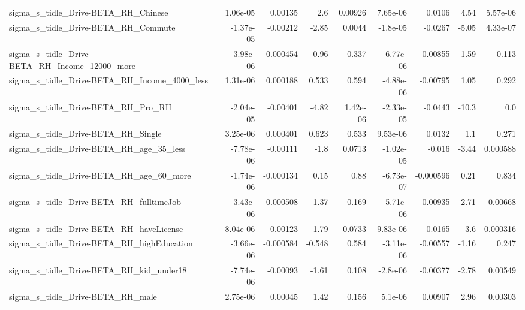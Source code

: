 \begin{tabular}{lrrrrrrrr}
sigma\_s\_tidle\_Drive-BETA\_RH\_Chinese                &    1.06e-05 &      0.00135 &       2.6 &  0.00926 &   7.65e-06 &      0.0106 &         4.54 &      5.57e-06 \\
sigma\_s\_tidle\_Drive-BETA\_RH\_Commute                &   -1.37e-05 &     -0.00212 &     -2.85 &   0.0044 &   -1.8e-05 &     -0.0267 &        -5.05 &      4.33e-07 \\
sigma\_s\_tidle\_Drive-BETA\_RH\_Income\_12000\_more      &   -3.98e-06 &    -0.000454 &     -0.96 &    0.337 &  -6.77e-06 &    -0.00855 &        -1.59 &         0.113 \\
sigma\_s\_tidle\_Drive-BETA\_RH\_Income\_4000\_less       &    1.31e-06 &     0.000188 &     0.533 &    0.594 &  -4.88e-06 &    -0.00795 &         1.05 &         0.292 \\
sigma\_s\_tidle\_Drive-BETA\_RH\_Pro\_RH                 &   -2.04e-05 &     -0.00401 &     -4.82 & 1.42e-06 &  -2.33e-05 &     -0.0443 &        -10.3 &           0.0 \\
sigma\_s\_tidle\_Drive-BETA\_RH\_Single                 &    3.25e-06 &     0.000401 &     0.623 &    0.533 &   9.53e-06 &      0.0132 &          1.1 &         0.271 \\
sigma\_s\_tidle\_Drive-BETA\_RH\_age\_35\_less            &   -7.78e-06 &     -0.00111 &      -1.8 &   0.0713 &  -1.02e-05 &      -0.016 &        -3.44 &      0.000588 \\
sigma\_s\_tidle\_Drive-BETA\_RH\_age\_60\_more            &   -1.74e-06 &    -0.000134 &      0.15 &     0.88 &  -6.73e-07 &   -0.000596 &         0.21 &         0.834 \\
sigma\_s\_tidle\_Drive-BETA\_RH\_fulltimeJob            &   -3.43e-06 &    -0.000508 &     -1.37 &    0.169 &  -5.71e-06 &    -0.00935 &        -2.71 &       0.00668 \\
sigma\_s\_tidle\_Drive-BETA\_RH\_haveLicense            &    8.04e-06 &      0.00123 &      1.79 &   0.0733 &   9.83e-06 &      0.0165 &          3.6 &      0.000316 \\
sigma\_s\_tidle\_Drive-BETA\_RH\_highEducation          &   -3.66e-06 &    -0.000584 &    -0.548 &    0.584 &  -3.11e-06 &    -0.00557 &        -1.16 &         0.247 \\
sigma\_s\_tidle\_Drive-BETA\_RH\_kid\_under18            &   -7.74e-06 &     -0.00093 &     -1.61 &    0.108 &   -2.8e-06 &    -0.00377 &        -2.78 &       0.00549 \\
sigma\_s\_tidle\_Drive-BETA\_RH\_male                   &    2.75e-06 &      0.00045 &      1.42 &    0.156 &    5.1e-06 &     0.00907 &         2.96 &       0.00303 \\

\end{tabular}
